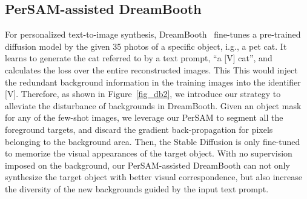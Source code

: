 \documentclass{article} \usepackage{iclr2024_conference,times}
\begin{document}
\subsection{PerSAM-assisted DreamBooth}
\label{s3.4}

For personalized text-to-image synthesis, DreamBooth~\citep{ruiz2022dreambooth} fine-tunes a pre-trained diffusion model by the given 35 photos of a specific object, i.g., a pet cat. It learns to generate the cat referred to by a text prompt, ``a [V] cat'', and calculates the loss over the entire reconstructed images. This 
This would inject the redundant background information in the training images into the identifier [V].
Therefore, as shown in Figure~\ref{fig_db2}, we introduce our strategy to alleviate the disturbance of backgrounds in DreamBooth.
Given an object mask for any of the few-shot images, we leverage our PerSAM to segment all the foreground targets, and discard the gradient back-propagation for pixels belonging to the background area. Then, the Stable Diffusion is only fine-tuned to memorize the visual appearances of the target object. With no supervision imposed on the background, our PerSAM-assisted DreamBooth can not only synthesize the target object with better visual correspondence, but also increase the diversity of the new backgrounds guided by the input text prompt.
\end{document}
